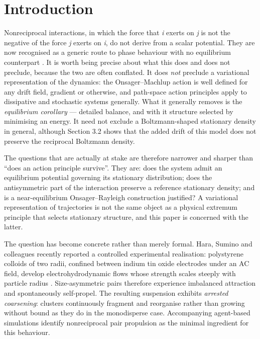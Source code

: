 \documentclass[aps,pre,preprint,superscriptaddress,nofootinbib,longbibliography]{revtex4-2}
\begin{document}

\maketitle

\section{Introduction}

Nonreciprocal interactions, in which the force that \emph{i} exerts on \emph{j} is not the negative of the force \emph{j} exerts on \emph{i}, do not derive from a scalar potential. They are now recognised as a generic route to phase behaviour with no equilibrium counterpart \cite{r2}. It is worth being precise about what this does and does not preclude, because the two are often conflated. It does \emph{not} preclude a variational representation of the dynamics: the Onsager--Machlup action is well defined for any drift field, gradient or otherwise, and path-space action principles apply to dissipative and stochastic systems generally. What it generally removes is the \emph{equilibrium corollary} --- detailed balance, and with it structure selected by minimising an energy. It need not exclude a Boltzmann-shaped stationary density in general, although Section 3.2 shows that the added drift of this model does not preserve the reciprocal Boltzmann density.

The questions that are actually at stake are therefore narrower and sharper than ``does an action principle survive''. They are: does the system admit an equilibrium potential governing its stationary distribution; does the antisymmetric part of the interaction preserve a reference stationary density; and is a near-equilibrium Onsager--Rayleigh construction justified? A variational representation of trajectories is not the same object as a physical extremum principle that selects stationary structure, and this paper is concerned with the latter.

The question has become concrete rather than merely formal. Hara, Sumino and colleagues recently reported a controlled experimental realisation: polystyrene colloids of two radii, confined between indium tin oxide electrodes under an AC field, develop electrohydrodynamic flows whose strength scales steeply with particle radius \cite{r1}. Size-asymmetric pairs therefore experience imbalanced attraction and spontaneously self-propel. The resulting suspension exhibits \emph{arrested coarsening}: clusters continuously fragment and reorganise rather than growing without bound as they do in the monodisperse case. Accompanying agent-based simulations identify nonreciprocal pair propulsion as the minimal ingredient for this behaviour.
\end{document}
